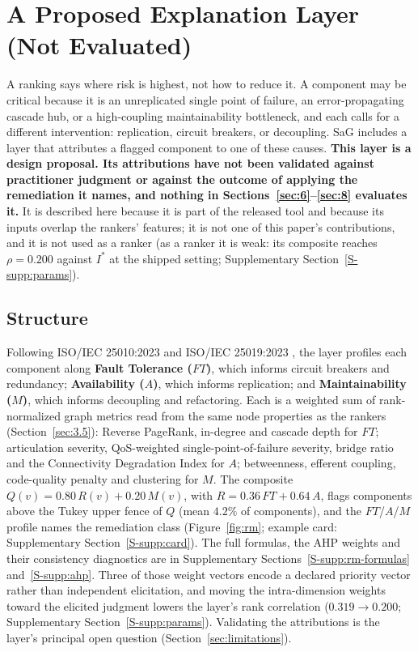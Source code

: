 \section{A Proposed Explanation Layer (Not Evaluated)}
\label{sec:5}

A ranking says where risk is highest, not how to reduce it. A component may be critical because it is an unreplicated single point of failure, an error-propagating cascade hub, or a high-coupling maintainability bottleneck, and each calls for a different intervention: replication, circuit breakers, or decoupling. SaG includes a layer that attributes a flagged component to one of these causes. \textbf{This layer is a design proposal. Its attributions have not been validated against practitioner judgment or against the outcome of applying the remediation it names, and nothing in Sections~\ref{sec:6}--\ref{sec:8} evaluates it.} It is described here because it is part of the released tool and because its inputs overlap the rankers' features; it is not one of this paper's contributions, and it is not used as a ranker (as a ranker it is weak: its composite reaches $\rho = 0.200$ against $I^*$ at the shipped setting; Supplementary Section~\ref{S-supp:params}).

\subsection{Structure}
\label{sec:5.1}
\label{sec:5.2}

Following ISO/IEC 25010:2023 \cite{iso25010_2023} and ISO/IEC 25019:2023 \cite{iso25019_2023}, the layer profiles each component along \textbf{Fault Tolerance ($FT$)}, which informs circuit breakers and redundancy; \textbf{Availability ($A$)}, which informs replication; and \textbf{Maintainability ($M$)}, which informs decoupling and refactoring. Each is a weighted sum of rank-normalized graph metrics read from the same node properties as the rankers (Section~\ref{sec:3.5}): Reverse PageRank, in-degree and cascade depth for $FT$; articulation severity, QoS-weighted single-point-of-failure severity, bridge ratio and the Connectivity Degradation Index for $A$; betweenness, efferent coupling, code-quality penalty and clustering for $M$. The composite $Q(v) = 0.80\,R(v) + 0.20\,M(v)$, with $R = 0.36\,FT + 0.64\,A$, flags components above the Tukey upper fence of $Q$ (mean $4.2\%$ of components), and the $FT$/$A$/$M$ profile names the remediation class (Figure~\ref{fig:rm}; example card: Supplementary Section~\ref{S-supp:card}). The full formulas, the AHP weights and their consistency diagnostics are in Supplementary Sections~\ref{S-supp:rm-formulas} and~\ref{S-supp:ahp}. Three of those weight vectors encode a declared priority vector rather than independent elicitation, and moving the intra-dimension weights toward the elicited judgment lowers the layer's rank correlation ($0.319 \to 0.200$; Supplementary Section~\ref{S-supp:params}). Validating the attributions is the layer's principal open question (Section~\ref{sec:limitations}).

